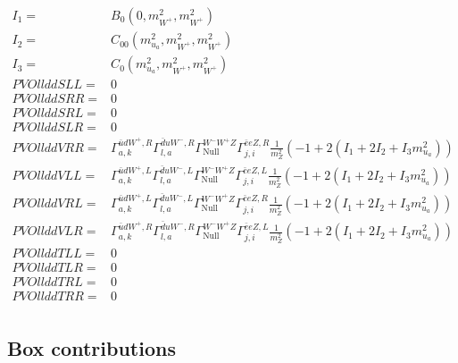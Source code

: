 \documentclass[A4,landscape]{article}
\begin{document}
\begin{align} 
I_1= & B_0(0, m^2_{W^+}, m^2_{W^+}) \\ 
I_2= & C_{00}(m^2_{u_{{a}}}, m^2_{W^+}, m^2_{W^+}) \\ 
I_3= & C_0(m^2_{u_{{a}}}, m^2_{W^+}, m^2_{W^+}) \\ 
  PVOllddSLL= & 0 \\ 
  PVOllddSRR= & 0 \\ 
  PVOllddSRL= & 0 \\ 
  PVOllddSLR= & 0 \\ 
  PVOllddVRR= &  \Gamma^{\bar{u}d W^+ ,R}_{a, k} \Gamma^{\bar{d}u W^-,R}_{l, a} \Gamma^{W^-W^+ Z }_\text{Null} \Gamma^{\bar{e}e Z ,R}_{j, i} \frac{1}{m^2_{Z}} (-1 + 2 (I_1 + 2 I_2 + I_3 m^2_{u_{{a}}})) \\ 
  PVOllddVLL= &  \Gamma^{\bar{u}d W^+ ,L}_{a, k} \Gamma^{\bar{d}u W^-,L}_{l, a} \Gamma^{W^-W^+ Z }_\text{Null} \Gamma^{\bar{e}e Z ,L}_{j, i} \frac{1}{m^2_{Z}} (-1 + 2 (I_1 + 2 I_2 + I_3 m^2_{u_{{a}}})) \\ 
  PVOllddVRL= &  \Gamma^{\bar{u}d W^+ ,L}_{a, k} \Gamma^{\bar{d}u W^-,L}_{l, a} \Gamma^{W^-W^+ Z }_\text{Null} \Gamma^{\bar{e}e Z ,R}_{j, i} \frac{1}{m^2_{Z}} (-1 + 2 (I_1 + 2 I_2 + I_3 m^2_{u_{{a}}})) \\ 
  PVOllddVLR= &  \Gamma^{\bar{u}d W^+ ,R}_{a, k} \Gamma^{\bar{d}u W^-,R}_{l, a} \Gamma^{W^-W^+ Z }_\text{Null} \Gamma^{\bar{e}e Z ,L}_{j, i} \frac{1}{m^2_{Z}} (-1 + 2 (I_1 + 2 I_2 + I_3 m^2_{u_{{a}}})) \\ 
  PVOllddTLL= & 0 \\ 
  PVOllddTLR= & 0 \\ 
  PVOllddTRL= & 0 \\ 
  PVOllddTRR= & 0 \\ 
\end{align} 
\subsection{Box contributions} 
\end{document}
